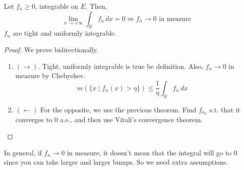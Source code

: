   \begin{corollary}
    Let $f_n \geq 0$, integrable on $E$. Then, 
    \begin{equation}
      \lim_{n \to +\infty} \int_E f_n \,dx = 0  \iff f_n \to 0 \text{ in measure}
    \end{equation}
    $f_n$ are tight and uniformly integrable. 
  \end{corollary}
  \begin{proof}
    We prove bidirectionally. 
    \begin{enumerate}
      \item $(\rightarrow)$. Tight, uniformly integrable is true be definition. Also, $f_n \to 0$ in measure by Chebyshev. 
        \begin{equation}
          m(\{x \mid f_n (x) > \eta\}) \leq \frac{1}{\eta} \int_E f_n \,dx 
        \end{equation}
      \item $(\leftarrow)$ For the opposite, we use the previous theorem. Find $f_{n_k}$ s.t. that it converges to $0$ a.e., and then use Vitali's convergence theorem. 
    \end{enumerate}
  \end{proof}

  In general, if $f_n \to 0$ in measure, it doesn't mean that the integral will go to $0$ since you can take larger and larger bumps. So we need extra assumptions. 

